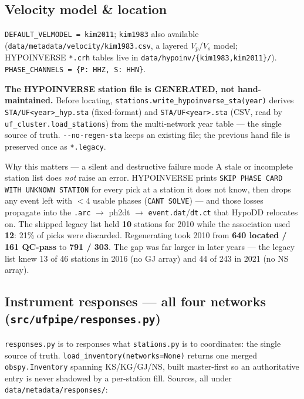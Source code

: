 \documentclass[11pt]{article}
\newcommand{\code}[1]{\texttt{#1}}
\begin{document}
\subsection{Velocity model \& location}
\code{DEFAULT\_VELMODEL = kim2011}; \code{kim1983} also available (\code{data/metadata/velocity/kim1983.csv},
a layered $V_p$/$V_s$ model; HYPOINVERSE \code{*.crh} tables live in \code{data/hypoinv/\{kim1983,kim2011\}/}).
\code{PHASE\_CHANNELS = \{P: HHZ, S: HHN\}}.

\medskip
\noindent\textbf{The HYPOINVERSE station file is GENERATED, not hand-maintained.} Before locating,
\code{stations.write\_hypoinverse\_sta(year)} derives \code{STA/UF<year>\_hyp.sta} (fixed-format) and
\code{STA/UF<year>.sta} (CSV, read by \code{uf\_cluster.load\_stations}) from the multi-network year table ---
the single source of truth. \code{-{}-no-regen-sta} keeps an existing file; the previous hand file is
preserved once as \code{*.legacy}.

\begin{warnbox}{Why this matters --- a silent and destructive failure mode}
A stale or incomplete station list does \emph{not} raise an error. HYPOINVERSE prints
\code{SKIP PHASE CARD WITH UNKNOWN STATION} for every pick at a station it does not know, then drops any event
left with $<4$ usable phases (\code{CANT SOLVE}) --- and those losses propagate into the \code{.arc}
$\rightarrow$ ph2dt $\rightarrow$ \code{event.dat}/\code{dt.ct} that HypoDD relocates on. The shipped legacy
list held \textbf{10} stations for 2010 while the association used \textbf{12}: 21\% of picks were discarded.
Regenerating took 2010 from \textbf{640 located / 161 QC-pass} to \textbf{791 / 303}. The gap was far larger in
later years --- the legacy list knew 13 of 46 stations in 2016 (no GJ array) and 44 of 243 in 2021 (no NS array).
\end{warnbox}

\subsection{Instrument responses --- all four networks (\code{src/ufpipe/responses.py})}
\code{responses.py} is to responses what \code{stations.py} is to coordinates: the single source of truth.
\code{load\_inventory(networks=None)} returns one merged \code{obspy.Inventory} spanning KS/KG/GJ/NS, built
master-first so an authoritative entry is never shadowed by a per-station fill. Sources, all under
\code{data/metadata/responses/}:
\end{document}
